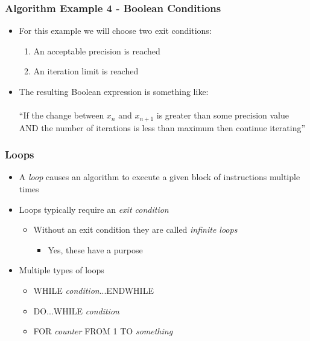 \documentclass[14pt]{beamer}
\begin{document}
\begin{frame}
\frametitle{Algorithm Example 4 - Boolean Conditions}
\begin{itemize}
\item For this example we will choose two exit conditions:
	\begin{enumerate}
		\item An acceptable precision is reached
		\item An iteration limit is reached
	\end{enumerate}
\item The resulting Boolean expression is something like:\\
~\\
``If the change between $x_n$ and $x_{n+1}$ is greater than some precision value AND the number of iterations is less than maximum then continue iterating''
\end{itemize}
\end{frame}

\begin{frame}
\frametitle{Loops}
\begin{itemize}
\item A \textit{loop} causes an algorithm to execute a given block of instructions multiple times
\item Loops typically require an \textit{exit condition}
	\begin{itemize}
		\item Without an exit condition they are called \textit{infinite loops}
		\begin{itemize}
			\item Yes, these have a purpose
		\end{itemize}
	\end{itemize}
\item Multiple types of loops
	\begin{itemize}
		\item WHILE \textit{condition}...ENDWHILE
		\item DO...WHILE \textit{condition}
		\item FOR \textit{counter} FROM 1 TO \textit{something}
	\end{itemize}
\end{itemize}
\end{frame}
\end{document}

